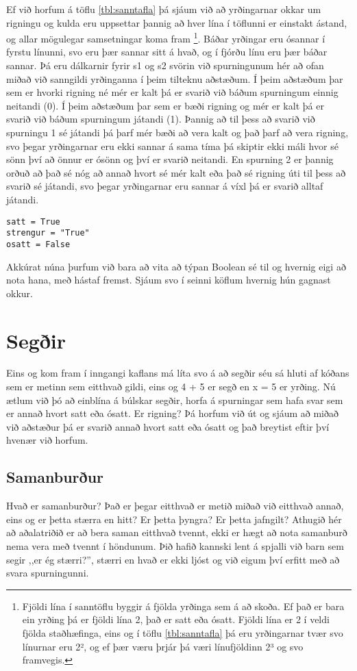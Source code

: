 Ef við horfum á töflu \ref{tbl:sanntafla} þá sjáum við að yrðingarnar okkar um rigningu og kulda eru uppsettar þannig að hver lína í töflunni er einstakt ástand, og allar mögulegar samsetningar koma fram \footnote{Fjöldi lína í sanntöflu byggir á fjölda yrðinga sem á að skoða. Ef það er bara ein yrðing þá er fjöldi lína 2, það er satt eða ósatt. Fjöldi lína er 2 í veldi fjölda staðhæfinga, eins og í töflu \ref{tbl:sanntafla} þá eru yrðingarnar tvær svo línurnar eru 2², og ef þær væru þrjár þá væri línufjöldinn 2³ og svo framvegis.}.
Báðar yrðingar eru ósannar í fyrstu línunni, svo eru þær sannar sitt á hvað, og í fjórðu línu eru þær báðar sannar.
Þá eru dálkarnir fyrir s1 og s2 svörin við spurningunum hér að ofan miðað við sanngildi yrðinganna í þeim tilteknu aðstæðum.
Í þeim aðstæðum þar sem er hvorki rigning né mér er kalt þá er svarið við báðum spurningum einnig neitandi (0).
Í þeim aðstæðum þar sem er bæði rigning og mér er kalt þá er svarið við báðum spurningum játandi (1).
Þannig að til þess að svarið við spurningu 1 sé játandi þá þarf mér bæði að vera kalt og það þarf að vera rigning, svo þegar yrðingarnar eru ekki sannar á sama tíma þá skiptir ekki máli hvor sé sönn því að önnur er ósönn og því er svarið neitandi.
En spurning 2 er þannig orðuð að það sé nóg að annað hvort sé mér kalt eða það sé rigning úti til þess að svarið sé játandi, svo þegar yrðingarnar eru sannar á víxl þá er svarið alltaf játandi.
\begin{lstlisting}[caption=Sanngildi geymd sem breytur, label=lst:bool-breytur]
satt = True
strengur = "True"
osatt = False
\end{lstlisting}

Akkúrat núna þurfum við bara að vita að týpan Boolean sé til og hvernig eigi að nota hana, með hástaf fremst.
Sjáum svo í seinni köflum hvernig hún gagnast okkur.


\section{Segðir}

Eins og kom fram í inngangi kaflans má líta svo á að segðir séu sá hluti af kóðans sem er metinn sem eitthvað gildi, eins og 4 + 5 er segð en x = 5 er yrðing.
Nú ætlum við þó að einblína á búlskar segðir, horfa á spurningar sem hafa svar sem er annað hvort satt eða ósatt.
Er rigning?
Þá horfum við út og sjáum að miðað við aðstæður þá er svarið annað hvort satt eða ósatt og það breytist eftir því hvenær við horfum.

\subsection{Samanburður}
Hvað er samanburður?
Það er þegar eitthvað er metið miðað við eitthvað annað, eins og er þetta stærra en hitt?
Er þetta þyngra?
Er þetta jafngilt?
Athugið hér að aðalatriðið er að bera saman eitthvað tvennt, ekki er hægt að nota samanburð nema vera með tvennt í höndunum.
Þið hafið kannski lent á spjalli við barn sem segir ,,er ég stærri?'', stærri en hvað er ekki ljóst og við eigum því erfitt með að svara spurningunni.


